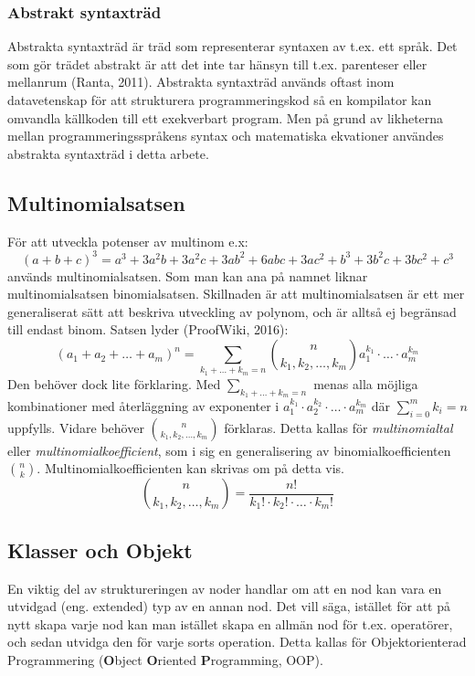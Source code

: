 \documentclass[12pt,a4paper]{article}
\begin{document}
\subsubsection{Abstrakt syntaxträd}
Abstrakta syntaxträd är träd som representerar syntaxen av t.ex. ett språk. Det som gör trädet abstrakt är att det inte tar hänsyn till t.ex. parenteser eller mellanrum (Ranta, 2011). Abstrakta syntaxträd används oftast inom datavetenskap för att strukturera programmeringskod så en kompilator kan omvandla källkoden till ett exekverbart program. Men på grund av likheterna mellan programmeringsspråkens syntax och matematiska ekvationer användes abstrakta syntaxträd i detta arbete.
\subsection{Multinomialsatsen}
För att utveckla potenser av multinom e.x: \[(a + b + c)^{3}=a^3+3a^2b+3a^2c+3ab^2+6abc+3ac^2+b^3+3b^2c+3bc^2+c^3\] används multinomialsatsen. Som man kan ana på namnet liknar multinomialsatsen binomialsatsen. Skillnaden är att multinomialsatsen är ett mer generaliserat sätt att beskriva utveckling av polynom, och är alltså ej begränsad till endast binom. Satsen lyder (ProofWiki, 2016):
\[(a_{1}+a_{2}+\ldots+a_{m})^{n}=\displaystyle\sum_{k_{1}+\dots+k_{m}=n}\binom{n}{k_{1},k_{2},\dots,k_{m}}a_{1}^{k_{1}}\cdot\ldots\cdot a_{m}^{k_{m}}\]
Den behöver dock lite förklaring. Med \(\displaystyle\sum_{k_{1}+\dots+k_{m}=n}\) menas alla möjliga kombinationer med återläggning av exponenter i \(a_{1}^{k_{1}}\cdot a_{2}^{k_{2}}\cdot\ldots\cdot a_{m}^{k_{m}}\) där \(\displaystyle\sum_{i=0}^{m}k_{i}=n\) uppfylls. Vidare behöver  \(\binom{n}{k_{1},k_{2},\ldots,k_{m}}\) förklaras. Detta kallas för \textit{multinomialtal} eller \textit{multinomialkoefficient}, som i sig en generalisering av binomialkoefficienten \(\binom{n}{k}\). Multinomialkoefficienten kan skrivas om på detta vis.
\[\binom{n}{k_{1},k_{2},\ldots,k_{m}}=\frac{n!}{k_{1}!\cdot k_{2}!\cdot\ldots\cdot k_{m}!}\]

\subsection{Klasser och Objekt}
\label{subsection:klasserochobjekt}
En viktig del av struktureringen av noder handlar om att en nod kan vara en utvidgad (eng. extended) typ av en annan nod. Det vill säga, istället för att på nytt skapa varje nod kan man istället skapa en allmän nod för t.ex. operatörer, och sedan utvidga den för varje sorts operation. Detta kallas för Objektorienterad Programmering (\textbf{O}bject \textbf{O}riented \textbf{P}rogramming, OOP). 
\end{document}
